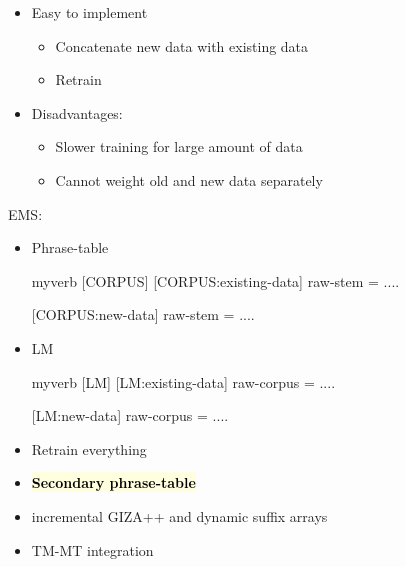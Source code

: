 \documentclass[landscape]{uedslides2C}
\newcommand{\currenttopic}[1]{\colorbox{lightyellow}{\textcolor{black}{\bf #1}}}
\begin{document}


\begin{itemize} \itemsep -1mm
 
\item Easy to implement
  \begin{itemize}
  \item Concatenate new data with existing data
  \item Retrain
  \end{itemize}
\item Disadvantages: 
  \begin{itemize}
  \item Slower training for large amount of data
  \item Cannot weight old and new data separately
  \end{itemize}
\end{itemize}


EMS:
\begin{itemize} \itemsep -1mm
\item Phrase-table
    \begin{SaveVerbatim}{myverb} 
      [CORPUS]
      [CORPUS:existing-data]
      raw-stem = ....
      
      [CORPUS:new-data]
      raw-stem = ....
    \end{SaveVerbatim}
    \colorbox{gray}{}

\item LM
   \begin{SaveVerbatim}{myverb} 
      [LM]
      [LM:existing-data]
      raw-corpus = ....
      
      [LM:new-data]
      raw-corpus = ....
    \end{SaveVerbatim}
    \colorbox{gray}{}
\end{itemize}


\begin{itemize}
\item Retrain everything
\item \currenttopic{Secondary phrase-table}
\item  incremental GIZA++ and dynamic suffix arrays
\item TM-MT integration

\end{itemize}
\end{document}
